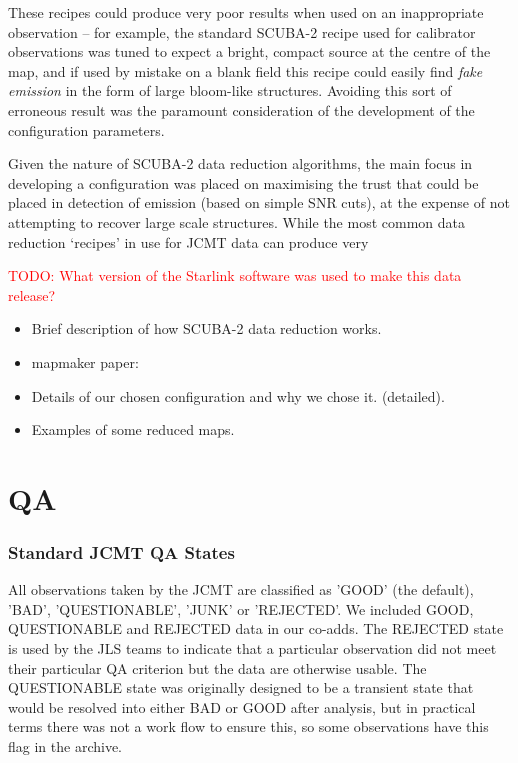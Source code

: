 \documentclass[usenatbib]{mn2e}
\newcommand{\todo}[1]{\textcolor{red}{TODO: #1}}
\begin{document}
These recipes could produce very poor results when used on an
inappropriate observation -- for example, the standard SCUBA-2 recipe
used for calibrator observations was tuned to expect a bright, compact
source at the centre of the map, and if used by mistake on a blank
field this recipe could easily find \emph{fake emission} in the form
of large bloom-like structures. Avoiding this sort of erroneous result
was the paramount consideration of the development of the
configuration parameters.


Given the nature of SCUBA-2 data reduction algorithms, the main focus
in developing a configuration was placed on maximising the trust that
could be placed in detection of emission (based on simple SNR cuts),
at the expense of not attempting to recover large scale
structures. While the most common data reduction `recipes' in use for
JCMT data can produce very

\todo{What version of the Starlink software was used to make this data
release?}

\begin{itemize}
\item Brief description of how SCUBA-2 data reduction works.
\item mapmaker paper: \citep{Chapin2013}
\item Details of our chosen configuration and why we chose it. (detailed).
\item Examples of some reduced maps.
\end{itemize}


\section{QA}
\label{sec:qa}
\subsubsection{Standard JCMT QA States}
All observations taken by the JCMT are classified as 'GOOD' (the
default), 'BAD', 'QUESTIONABLE', 'JUNK' or 'REJECTED'. We included
GOOD, QUESTIONABLE and REJECTED data in our co-adds. The REJECTED
state is used by the JLS teams to indicate that a particular
observation did not meet their particular QA criterion but the data
are otherwise usable. The QUESTIONABLE
state was originally designed to be a transient state that would be
resolved into either BAD or GOOD after analysis, but in practical
terms there was not a work flow to ensure this, so some observations
have this flag in the archive.
\end{document}
